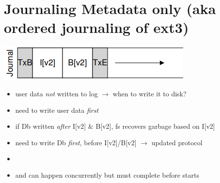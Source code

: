 \section*{Journaling Metadata only (aka ordered journaling of ext3)}
\begin{minipage}{.5\linewidth}
  \includegraphics[width=\linewidth]{imgs/jn_mj1}
\end{minipage}
\begin{minipage}{.5\linewidth}
  \flushleft
  \begin{itemize}
  \item user data \emph{not} written to log $\to$ when to write it to disk?
  \item need to write user data \emph{first}
  \end{itemize}
\end{minipage}
\begin{itemize}
\item if Db written \emph{after} I[v2] \& B[v2], fs recovers garbage based on I[v2]
\item need to write Db \emph{first}, before I[v2]/B[v2] $\to$ updated protocol \faHandODown
\item
\item {} and  can happen concurrently but must complete before  starts
\end{itemize}
